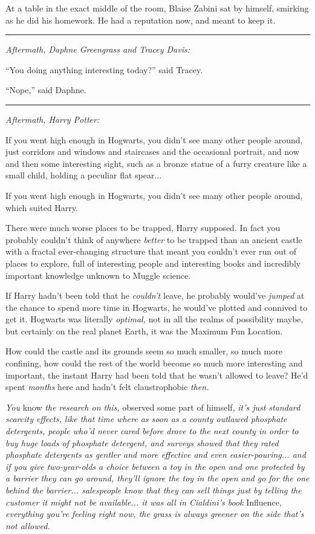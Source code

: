 At a table in the exact middle of the room, Blaise Zabini sat by
himself, smirking as he did his homework. He had a reputation now, and
meant to keep it.

\begin{center}\rule{3in}{0.4pt}\end{center}

\emph{Aftermath, Daphne Greengrass and Tracey Davis:}

``You doing anything interesting today?'' said Tracey.

``Nope,'' said Daphne.

\begin{center}\rule{3in}{0.4pt}\end{center}

\emph{Aftermath, Harry Potter:}

If you went high enough in Hogwarts, you didn't see many other people
around, just corridors and windows and staircases and the occasional
portrait, and now and then some interesting sight, such as a bronze
statue of a furry creature like a small child, holding a peculiar flat
spear...

If you went high enough in Hogwarts, you didn't see many other people
around, which suited Harry.

There were much worse places to be trapped, Harry supposed. In fact you
probably couldn't think of anywhere \emph{better} to be trapped than an
ancient castle with a fractal ever-changing structure that meant you
couldn't ever run out of places to explore, full of interesting people
and interesting books and incredibly important knowledge unknown to
Muggle science.

If Harry hadn't been told that he \emph{couldn't} leave, he probably
would've \emph{jumped} at the chance to spend more time in Hogwarts, he
would've plotted and connived to get it. Hogwarts was literally
\emph{optimal,} not in all the realms of possibility maybe, but
certainly on the real planet Earth, it was the Maximum Fun Location.

How could the castle and its grounds seem so much smaller, so much more
confining, how could the rest of the world become so much more
interesting and important, the instant Harry had been told that he
wasn't allowed to leave? He'd spent \emph{months} here and hadn't felt
claustrophobic \emph{then.}

\emph{You} know \emph{the research on this,} observed some part of
himself, \emph{it's just standard scarcity effects, like that time where
as soon as a county outlawed phosphate detergents, people who'd never
cared before drove to the next county in order to buy huge loads of
phosphate detergent, and surveys showed that they rated phosphate
detergents as gentler and more effective and even easier-pouring...
and if you give two-year-olds a choice between a toy in the open and one
protected by a barrier they can go around, they'll ignore the toy in the
open and go for the one behind the barrier... salespeople know that
they can sell things just by telling the customer it might not be
available... it was all in Cialdini's book} Influence,
\emph{everything you're feeling right now, the grass is always greener
on the side that's not allowed.}

